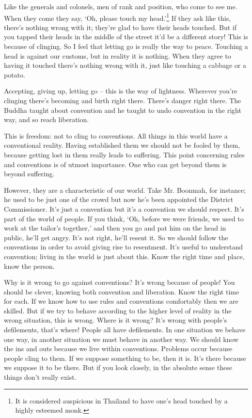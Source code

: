 Like the generals and colonels, men of rank and position, who come to see me. When they come they say, `Oh, please touch my head.'\footnote{It is considered auspicious in Thailand to have one's head touched by a highly esteemed monk.} If they ask like this, there's nothing wrong with it; they're glad to have their heads touched. But if you tapped their heads in the middle of the street it'd be a different story! This is because of clinging. So I feel that letting go is really the way to peace. Touching a head is against our customs, but in reality it is nothing. When they agree to having it touched there's nothing wrong with it, just like touching a cabbage or a potato. 

Accepting, giving up, letting go -- this is the way of lightness. Wherever you're clinging there's becoming and birth right there. There's danger right there. The Buddha taught about convention and he taught to undo convention in the right way, and so reach liberation. 

This is freedom: not to cling to conventions. All things in this world have a conventional reality. Having established them we should not be fooled by them, because getting lost in them really leads to suffering. This point concerning rules and conventions is of utmost importance. One who can get beyond them is beyond suffering. 

However, they are a characteristic of our world. Take Mr. Boonmah, for instance; he used to be just one of the crowd but now he's been appointed the District Commissioner. It's just a convention but it's a convention we should respect. It's part of the world of people. If you think, `Oh, before we were friends, we used to work at the tailor's together,' and then you go and pat him on the head in public, he'll get angry. It's not right, he'll resent it. So we should follow the conventions in order to avoid giving rise to resentment. It's useful to understand convention; living in the world is just about this. Know the right time and place, know the person. 

Why is it wrong to go against conventions? It's wrong because of people! You should be clever, knowing both convention and liberation. Know the right time for each. If we know how to use rules and conventions comfortably then we are skilled. But if we try to behave according to the higher level of reality in the wrong situation, this is wrong. Where is it wrong? It's wrong with people's defilements, that's where! People all have defilements. In one situation we behave one way, in another situation we must behave in another way. We should know the ins and outs because we live within conventions. Problems occur because people cling to them. If we suppose something to be, then it is. It's there because we suppose it to be there. But if you look closely, in the absolute sense these things don't really exist. 


